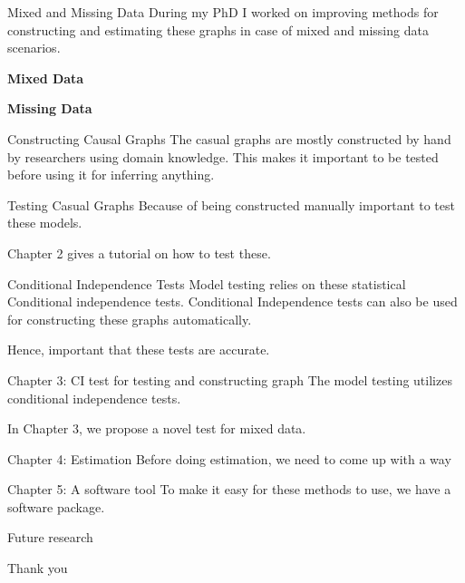 \documentclass[aspectratio=169]{beamer}
\begin{document}
\begin{frame}{Mixed and Missing Data}
	During my PhD I worked on improving methods for constructing and estimating these graphs in case of mixed and missing data scenarios.

	\textbf{Mixed Data}

	\textbf{Missing Data}
\end{frame}

\begin{frame}{Constructing Causal Graphs}
	The casual graphs are mostly constructed by hand by researchers using domain knowledge.
	This makes it important to be tested before using it for inferring anything.
\end{frame}

\begin{frame}{Testing Casual Graphs}
	Because of being constructed manually important to test these models.

	Chapter 2 gives a tutorial on how to test these.
\end{frame}

\begin{frame}{Conditional Independence Tests}
	Model testing relies on these statistical Conditional independence tests.
	Conditional Independence tests can also be used for constructing these graphs
	automatically.

	Hence, important that these tests are accurate.
\end{frame}

\begin{frame}{Chapter 3: CI test for testing and constructing graph}
	The model testing utilizes conditional independence tests.

	In Chapter 3, we propose a novel test for mixed data.
\end{frame}

\begin{frame}{Chapter 4: Estimation}
	Before doing estimation, we need to come up with a way 
\end{frame}

\begin{frame}{Chapter 5: A software tool}
	To make it easy for these methods to use, we have a software package.
\end{frame}

\begin{frame}{Future research}
\end{frame}

\begin{frame}
	\Huge{Thank you}
\end{frame}
\end{document}

